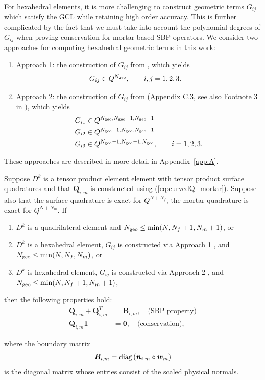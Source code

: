 \documentclass{svjour3}                     %
\newcommand{\diag}[1]{{\rm diag}\LRp{#1}}
\newcommand{\LRp}[1]{\left( #1 \right)}
\begin{document}
For hexahedral elements, it is more challenging to construct geometric terms $G_{ij}$ which satisfy the GCL while retaining high order accuracy.  This is further complicated by the fact that we must take into account the polynomial degrees of $G_{ij}$ when proving conservation for mortar-based SBP operators.  We consider two approaches for computing hexahedral geometric terms in this work:
\begin{enumerate}
\item Approach 1: the construction of $G_{ij}$ from \cite{kopriva2006metric}, which yields 
\begin{align*}
&G_{ij} \in Q^{N_{\rm geo}}, \qquad i,j = 1,2,3.
\end{align*}
\item Approach 2: the construction of $G_{ij}$ from \cite{kozdon2018energy} (Appendix C.3, see also Footnote 3 in \cite{chan2019skew}), which yields
\begin{align*}
&G_{i1} \in Q^{N_{\rm geo},N_{\rm geo}-1,N_{\rm geo}-1}\\
&G_{i2} \in Q^{N_{\rm geo}-1,N_{\rm geo},N_{\rm geo}-1}\\
&G_{i3} \in Q^{N_{\rm geo}-1,N_{\rm geo}-1,N_{\rm geo}}, \qquad i = 1,2,3.
\end{align*}
\end{enumerate}
These approaches are described in more detail in Appendix~\ref{app:A}.  
\begin{lemma}
\label{lemma:Qmprops_3d}
Suppose $D^k$ is a tensor product element element with tensor product surface quadratures and that $\bm{Q}_{i,m}$ is constructed using (\ref{eq:curvedQ_mortar}).  Suppose also that the surface quadrature is exact for $Q^{N+N_f}$,  the mortar quadrature is exact for $Q^{N+N_m}$.  If 
\begin{enumerate}
\item $D^k$ is a quadrilateral element and $N_{\rm geo} \leq \min(N,N_f+1,N_m+1)$, or
\item $D^k$ is a hexahedral element, $G_{ij}$ is constructed via Approach 1 \cite{kopriva2006metric}, and $N_{\rm geo} \leq \min(N,N_f,N_m)$, or
\item $D^k$ is hexahedral element, $G_{ij}$ is constructed via Approach 2 \cite{kozdon2018energy}, and $N_{\rm geo} \leq \min(N,N_f+1,N_m+1)$, 
\end{enumerate}
then the following properties hold:
\begin{align*}
\bm{Q}_{i,m} + \bm{Q}_{i,m}^T &= \bm{B}_{i,m}, \quad \text{(SBP property)}\\
\bm{Q}_{i,m}\bm{1} &= \bm{0}, \quad \text{(conservation)},
\end{align*}

where the boundary matrix 
\begin{equation}
\bm{B}_{i,m} = \diag{\bm{n}_{i,m}\circ \bm{w}_m}
\end{equation}
is the diagonal matrix whose entries consist of the scaled physical normals. 
\end{lemma}
\end{document}
